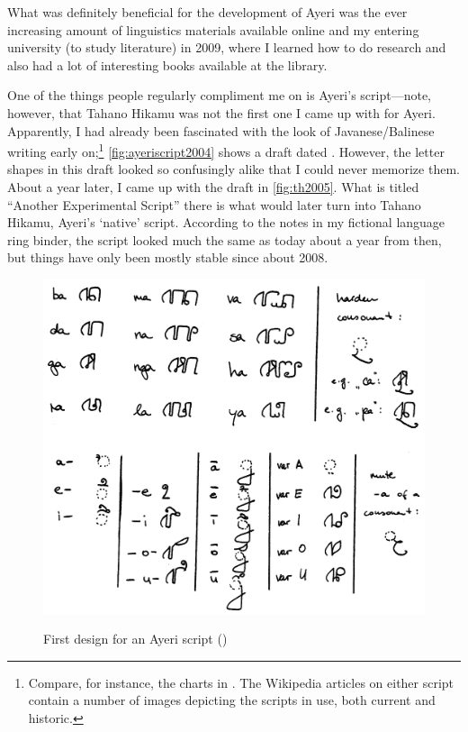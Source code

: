 What was definitely beneficial for the development of Ayeri was the ever 
increasing amount of linguistics materials available online and my entering 
university (to study literature) in 2009, where I learned how to do research 
and also had a lot of interesting books available at the library.

One of the things people regularly compliment me on is Ayeri's script---note, 
however, that Tahano Hikamu was not the first one I came up with for Ayeri. 
Apparently, I had already been fascinated with the look of Javanese/Balinese 
writing early on;\footnote{Compare, for instance, the charts in 
\citet{kuipersmcdermott1996}. The Wikipedia articles on either script contain a 
number of images depicting the scripts in use, both current and historic.} 
\autoref{fig:ayeriscript2004} shows a draft dated . 
However, the letter shapes in this draft looked so confusingly alike that I 
could never memorize them. About a year later, I came up with the draft in 
\autoref{fig:th2005}. What is titled ``Another Experimental Script'' there is 
what would later turn into Tahano Hikamu, Ayeri's `native' script. According to 
the notes in my fictional language ring binder, the script looked much the same 
as today about a year from then, but things have only been mostly stable since 
about 2008.

\begin{figure}[tph]
	\centering
	\caption[First design for an Ayeri script]{First design for an Ayeri script ()}
	\includegraphics[width=\textwidth, keepaspectratio]{images/ayeriscript2004-300dpi-bw.png}
	\label{fig:ayeriscript2004}
\end{figure}

